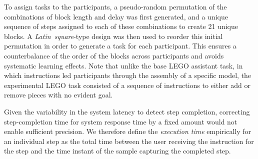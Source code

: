\documentclass[10pt,letterpaper]{article}
\begin{document}
To assign tasks to the participants, a pseudo-random permutation of the combinations of block length and delay was first generated, and a unique sequence of steps assigned to each of these combinations to create 21 unique blocks.
A \emph{Latin~square}-type design was then used to reorder this initial permutation in order to generate a task for each participant.
This ensures a counterbalance of the order of the blocks across participants and avoids systematic learning effects. 
Note that unlike the base LEGO assistant task, in which instructions led participants through the assembly of a specific model, the experimental LEGO task consisted of a sequence of instructions to either add or remove pieces with no evident goal.




Given the variability in the system latency to detect step completion, correcting step-completion time for system response time by a fixed amount would not enable sufficient precision.
We therefore define the \emph{execution time} empirically for an individual step as the total time between the user receiving the instruction for the step and the time instant of the sample capturing the completed step.

\end{document}
